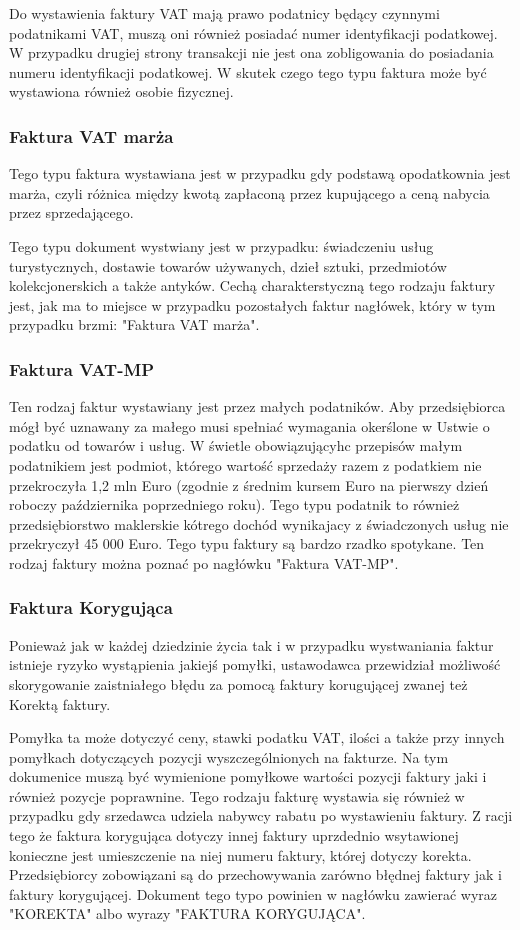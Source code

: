 Do wystawienia faktury VAT mają prawo podatnicy będący czynnymi podatnikami VAT,
muszą oni również posiadać numer identyfikacji podatkowej. W przypadku drugiej
strony transakcji nie jest ona zobligowania do posiadania numeru identyfikacji
podatkowej. W skutek czego tego typu faktura może być wystawiona również osobie
fizycznej.


\subsubsection{Faktura VAT marża}
Tego typu faktura wystawiana jest w przypadku gdy podstawą opodatkownia jest
marża, czyli różnica między kwotą zapłaconą przez kupującego a ceną nabycia
przez sprzedającego.


Tego typu dokument wystwiany jest w przypadku: świadczeniu usług
turystycznych, dostawie towarów używanych, dzieł sztuki, przedmiotów
kolekcjonerskich a także antyków. Cechą charakterstyczną tego rodzaju faktury
jest, jak ma to miejsce w przypadku pozostałych faktur nagłówek, który w tym
przypadku brzmi: "Faktura VAT marża".
\subsubsection{Faktura VAT-MP}
Ten rodzaj faktur wystawiany jest przez małych podatników. Aby przedsiębiorca
mógł być uznawany za małego musi spełniać wymagania okerślone w Ustwie o
podatku od towarów i usług. W świetle obowiązującyhc przepisów małym
podatnikiem jest podmiot, którego wartość sprzedaży razem z podatkiem nie
przekroczyła 1,2 mln Euro (zgodnie z średnim kursem Euro na pierwszy dzień
roboczy października poprzedniego roku). Tego typu podatnik to również
przedsiębiorstwo maklerskie kótrego dochód wynikajacy z świadczonych usług nie
przekryczył 45 000 Euro. Tego typu faktury są bardzo rzadko spotykane. Ten
rodzaj faktury można poznać po nagłówku "Faktura VAT-MP".
\subsubsection{Faktura Korygująca}
Ponieważ jak w każdej dziedzinie życia tak i w przypadku wystwaniania faktur
istnieje ryzyko wystąpienia jakiejś pomyłki, ustawodawca przewidział możliwość
skorygowanie zaistniałego błędu za pomocą faktury korugującej zwanej też Korektą
faktury.


Pomyłka ta może dotyczyć ceny, stawki podatku VAT, ilości a także przy innych pomyłkach dotyczących
pozycji wyszczególnionych na fakturze. Na tym dokumenice muszą być wymienione
pomyłkowe wartości pozycji faktury jaki i również pozycje poprawnine. Tego
rodzaju fakturę wystawia się również w przypadku gdy srzedawca udziela nabywcy rabatu po wystawieniu faktury. Z racji tego że faktura korygująca dotyczy innej
faktury uprzdednio wsytawionej konieczne jest umieszczenie na niej numeru
faktury, której dotyczy korekta. Przedsiębiorcy zobowiązani są do przechowywania
zarówno błędnej faktury jak i faktury korygującej. Dokument tego typo powinien w
nagłówku zawierać wyraz "KOREKTA" albo wyrazy "FAKTURA KORYGUJĄCA".

